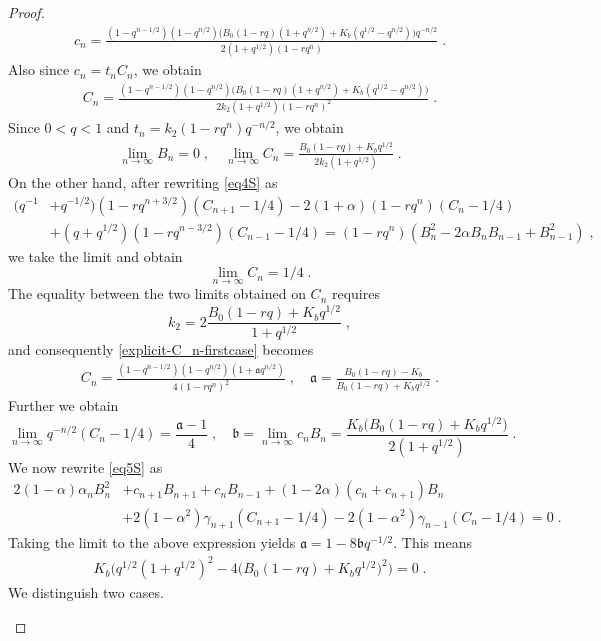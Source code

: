 \documentclass{amsart}
\theoremstyle{remark}
\numberwithin{equation}{section}
\begin{document}
\begin{proof}
\begin{align}\label{explicit-c_n-firstcase}
c_n= \frac{(1-q^{n-1/2})(1-q^{n/2})\big(B_0(1-rq)(1+q^{n/2})+K_b(q^{1/2}-q^{n/2}) \big)q^{-n/2}}{2(1+q^{1/2})(1-rq^n)}\;.
\end{align}
Also since $c_n=t_nC_n$, we obtain
\begin{align}\label{explicit-C_n-firstcase}
C_n= \frac{(1-q^{n-1/2})(1-q^{n/2})\big(B_0(1-rq)(1+q^{n/2})+K_b(q^{1/2}-q^{n/2}) \big)}{2k_2(1+q^{1/2})(1-rq^n)^2}\;.
\end{align}
Since $0<q<1$ and $t_n=k_2(1-rq^n)q^{-n/2}$, we obtain
\begin{align*}
\lim_{n\rightarrow \infty} B_n=0\;, \quad \lim_{n\rightarrow \infty} C_n=\frac{B_0(1-rq)+K_bq^{1/2}}{2k_2(1+q^{1/2})}\;.
\end{align*}
On the other hand, after rewriting \eqref{eq4S} as
\begin{align*}
(q^{-1}&+q^{-1/2})(1-rq^{n+3/2})(C_{n+1}-1/4)-2(1+\alpha)(1-rq^n)(C_n-1/4)\\
&+(q+q^{1/2})(1-rq^{n-3/2})(C_{n-1}-1/4)=(1-rq^n)(B_n^2 -2\alpha B_nB_{n-1}+B_{n-1} ^2)\;,
\end{align*}
we take the limit and obtain $$\lim_{n\rightarrow \infty}C_n=1/4\;.$$
The equality between the two limits obtained on $C_n$ requires 
$$k_2=2\frac{B_0(1-rq)+K_bq^{1/2}}{1+q^{1/2}}\;,$$ and consequently \eqref{explicit-C_n-firstcase} becomes
\begin{align*}
C_n=\frac{(1-q^{n-1/2})(1-q^{n/2})(1+\mathfrak{a}q^{n/2})}{4(1-rq^n)^2}\;,\quad \mathfrak{a}=\frac{B_0(1-rq)-K_b}{B_0(1-rq)+K_bq^{1/2}}\;.
\end{align*}
Further we obtain
$$\lim_{n\rightarrow \infty}q^{-n/2}(C_n-1/4)=\frac{\mathfrak{a}-1}{4}\;,\quad \mathfrak{b}=\lim_{n\rightarrow \infty}c_nB_n=\frac{K_b\big(B_0(1-rq)+K_bq^{1/2}\big)}{2(1+q^{1/2})} \;.$$
We now rewrite \eqref{eq5S} as
\begin{align*}
2(1-\alpha)\alpha_nB_n^2 &+c_{n+1}B_{n+1}+c_nB_{n-1} +(1-2\alpha)(c_n+c_{n+1})B_n\\ &+2(1-\alpha^2)\gamma_{n+1}(C_{n+1}-1/4) -2(1-\alpha^2)\gamma_{n-1}(C_n-1/4)=0\;. 
\end{align*}
Taking the limit to the above expression yields $\mathfrak{a}=1-8\mathfrak{b}q^{-1/2}$. This means
\begin{align}
K_b\Big(q^{1/2}(1+q^{1/2})^2-4\big(B_0(1-rq)+K_bq^{1/2} \big)^2  \Big)=0\;.
\end{align}
We distinguish two cases.
\begin{itemize}

\end{itemize}
\end{proof}
\end{document}
